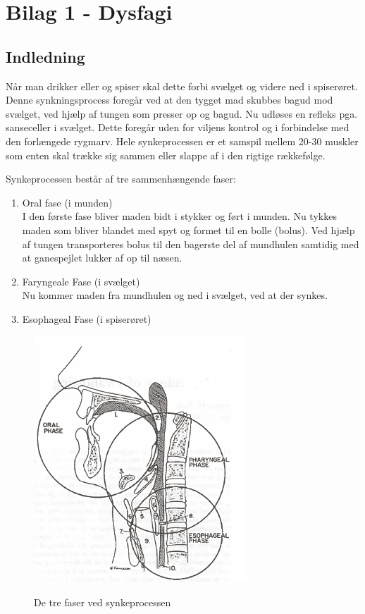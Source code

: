 \documentclass[main.tex]{subfiles}
\begin{document}
\chapter*{Bilag 1 - Dysfagi}
\label{Bilag1}
\section*{Indledning}
Når man drikker eller og spiser skal dette forbi svælget og videre ned i spiserøret. Denne synkningsprocess foregår ved at den tygget mad skubbes bagud mod svælget, ved hjælp af tungen som presser op og bagud. Nu udløses en refleks pga. sanseceller i svælget. Dette foregår uden for viljens kontrol og i forbindelse med den forlængede rygmarv. Hele synkeprocessen er et samspil mellem 20-30 muskler som enten skal trække sig sammen eller slappe af i den rigtige rækkefølge. \cite{Sand2008MennesketsFysiologi}

Synkeprocessen består af tre sammenhængende faser:\cite{Bass1992Dysphagia:Management}
\begin{enumerate}
\item Oral fase (i munden)\\
I den første fase bliver maden bidt i stykker og ført i munden. Nu tykkes maden som bliver blandet med spyt og formet til en bolle (bolus). Ved hjælp af tungen transporteres bolus til den bagerste del af mundhulen samtidig med at ganespejlet lukker af op til næsen.
\item Faryngeale Fase (i svælget)\\
Nu kommer maden fra mundhulen og ned i svælget, ved at der synkes. 
\item Esophageal Fase (i spiserøret)
\end{enumerate}

\begin{figure}[H]
\centering
{\includegraphics[width=8cm]
{Figure/dysfagi3faser}}
\caption{De tre faser ved synkeprocessen\cite{Bass1992Dysphagia:Management}}
\label{trefaser}
\end{figure}
\end{document}
